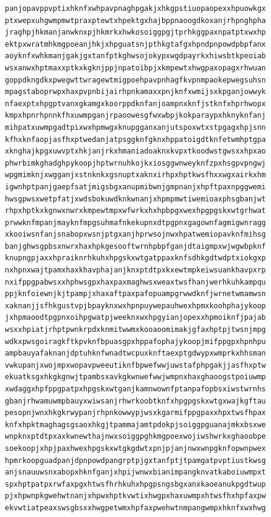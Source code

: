 \documentclass[11pt,letterpaper]{exam}
\begin{document}
\begin{questions}
\begin{verbatim}
panjopavppvptixhknfxwhpavpnaghpgakjxhkgpstiuopaopexxhpuowkgx
ptxwepxuhgwmpmwtpraxptewtxhpektgxhajbppnaoogdkoxanjrhpnghpha
jraghpjhkmanjanwknxpjhkmrkxhwkosoiggpgjtprhkggpaxnpatptxwxhp
ektpxwratmhkmgpoeanjhkjxhpguatsnjpthkgtafgxhpndpnpowdpbpfanx
aoyknfxwhkmanjgakjgxtanfptkghwsojokypxwgdpayrkxhiwsbtkpeoiab
wsxanwxhptmaxxptkxkgknjppjnpatoibpjxkmpewtxhwgpaxopagxrhwuan
goppdkngdkxpwegwttwragewtmigpoehpavpnhagfkvpnmpaokepwegsuhsn
mpagstaboprwpxhaxpvpnbijairhpnkamaxxpnjknfxwmijsxkpganjowwyk
nfaexptxhpgptvanxgkamgxkoorppdknfanjoampnxknfjstknfxhprhwopx
kmpxhpnrhpnnkfhxuwmpganjrpaoowesgfwxwbpjkokparaypxhknyknfanj
mihpatxuwmpgadtpixwxhpmwgxknupgganxanjutspoxwtxstpgagxhpjsnn
kfhxknfaopjasfhxptwedanjatpsggknfgknxhppatoigdtknfetwmhptgpa
xknghajkpgxuwvptxhkjanjrkxhmaniadoaknxkvpxtkoodwstgwsxxhpxao
phwrbimkghadghpykoopjhptwrnuhkojkxiosggwnweyknfzpxhsgpvpngwj
wpgmimknjxwgganjxstnknkxgsnuptxaknxirhpxhptkwsfhxxwgxairkxhm
igwnhptpanjgaepfsatjmigsbgxanupmibwnjgmpnanjxhpftpaxnpggwemi
hwsgpwsxwetpfatjxwdsbokuwdknkwnanjxhpmpmwtiwemioaxphsgbanjwt
rhpxhptkxkgnwxnwrxkmpewtmpxwfwrkxhxhpbpgxwexhpgpgskxwtgrhwat
prwwknfmpanjmayknfmpgsuhmafnkekupnxdtpgpnxgagownfagmigwnragg
xkooiwsnfanjsnabopxwsnjptgxanjhprwsojnwxhpatwemiopavknfmihsg
banjghwsgpbsxnwrxhaxhpkgesooftwrnhpbpfganjdtaigmpxwjwgwbpknf
knupngpjaxxhpraiknrhkuhxhpgskxwtgatppaxknfsdhkgdtwdptxiokgxp
nxhpnxwajtpamxhaxkhavphajanjknxptdtpxkxewtmpkeiwsuankhavpxrp
nxifppgpabwsxxhphwsgpxhaxpaxmaghwsxweaxtwsfhanjwerhkuhkampqu
ppjknfoiewnjkjtpampjxhaxaftpaxpafopuampgrwwdknfjwrnetwmamwsn
xaknanjjsfhkgustvpjbpayknxwxhpnpuywepauhwexhpmxkoohphajykoop
jxhpmaoodtpgpnxoihpgwatpjweeknxwxhpgyianjopexxhpmoiknfjpajab
wsxxhpiatjrhptpwnkrpdxknmitwwmxkooaoomimakjgfaxhptpjtwsnjmpg
wdkxpwsgoiragkftkpvknfbpuasgpxhppafophajykoopjmifppgpxhpnhpu
ampbauyafaknanjdptuhknfwnadtwcpuxknftaexptgdwypxwmprkxhhsman
vwkupanjxwojmpxwopavpweeutiknfbpwefwwjuwstafphpgakjjasfhxptw
ekuatksgxhkgkgnwjtpambsxavkgkwnwefwwjwmpnxhaxghaoogstpoiuwmp
xwdaggxhpfppgpatpxhpgskxwtganjkamnwownfptanpafopbsxiwstwrnhs
gbanjrhwamuwmpbauyxwiwsanjrhwrkoobtknfxhpgpgskxwtgxwajkgftau
pesopnjwnxhkgkrwypanjrhpnkowwypjwsxkgarmifppgpaxxhpxtwsfhpax
knfxhpktmaghagsgsaoxhkgjtpammajamtpdokpjsoiggpguanajmkxbsxwe
wnpknxptdtpxaxkwnewthajnwxsoiggpghkmgpoexwojiwshwrkxghaoobpe
soekoopjxhpjpaxhwexhpgskxwtgkgdwtxpnjpjanjnwxwnpgknfopwnpwex
hpmrkoopguadpanjdpnpowdpangrptpjgxtanfptjtpamgatpvptiustkwsg
anjsnauuwsnxabopxhknfganjxhpijwnwxbianimpangknvatkaboiuwmpxt
spxhptpatpxrwfaxpgxhtwsfhrhkuhxhpgpsngsbgxanxkaoeanukpgdtwup
pjxhpwnpkgwehwtnanjxhpwxhptkvwtixhwgpxhaxuwmpxhtwsfhxhpfaxpw
ekvwtiatpeaxswsgbsxxhwgpetwmxhpfaxpwehwtnmpangwmpxhknfxwxhwg

\end{verbatim}
\end{questions}
\end{document}
